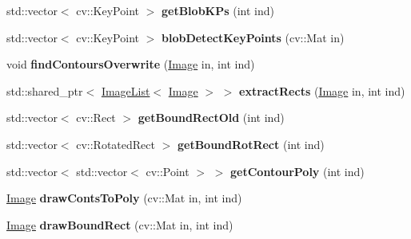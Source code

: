 \begin{DoxyCompactItemize}
\item 
std\+::vector$<$ cv\+::\+Key\+Point $>$ {\bfseries get\+Blob\+K\+Ps} (int ind)\hypertarget{classSegmenter_a36f865cdde985f42fbda4d49adee6eec}{}\label{classSegmenter_a36f865cdde985f42fbda4d49adee6eec}

\item 
std\+::vector$<$ cv\+::\+Key\+Point $>$ {\bfseries blob\+Detect\+Key\+Points} (cv\+::\+Mat in)\hypertarget{classSegmenter_a04e707d0e2d027d411ed1d49f1675a39}{}\label{classSegmenter_a04e707d0e2d027d411ed1d49f1675a39}

\item 
void {\bfseries find\+Contours\+Overwrite} (\hyperlink{classImage}{Image} in, int ind)\hypertarget{classSegmenter_a83f1dadfa90c7a55065bf7508f836a50}{}\label{classSegmenter_a83f1dadfa90c7a55065bf7508f836a50}

\item 
std\+::shared\+\_\+ptr$<$ \hyperlink{classImageList}{Image\+List}$<$ \hyperlink{classImage}{Image} $>$ $>$ {\bfseries extract\+Rects} (\hyperlink{classImage}{Image} in, int ind)\hypertarget{classSegmenter_ad1306f3d25657db48c54586169c607cd}{}\label{classSegmenter_ad1306f3d25657db48c54586169c607cd}

\item 
std\+::vector$<$ cv\+::\+Rect $>$ {\bfseries get\+Bound\+Rect\+Old} (int ind)\hypertarget{classSegmenter_a0ed74b8610d04960e96545a2769c791e}{}\label{classSegmenter_a0ed74b8610d04960e96545a2769c791e}

\item 
std\+::vector$<$ cv\+::\+Rotated\+Rect $>$ {\bfseries get\+Bound\+Rot\+Rect} (int ind)\hypertarget{classSegmenter_ad962f1ec52b2a08611cc6df03773ab61}{}\label{classSegmenter_ad962f1ec52b2a08611cc6df03773ab61}

\item 
std\+::vector$<$ std\+::vector$<$ cv\+::\+Point $>$ $>$ {\bfseries get\+Contour\+Poly} (int ind)\hypertarget{classSegmenter_a6b072eb0387886c01f5cf19cba30d738}{}\label{classSegmenter_a6b072eb0387886c01f5cf19cba30d738}

\item 
\hyperlink{classImage}{Image} {\bfseries draw\+Conts\+To\+Poly} (cv\+::\+Mat in, int ind)\hypertarget{classSegmenter_ab84556c3c16c492f78fb11ad4553a68a}{}\label{classSegmenter_ab84556c3c16c492f78fb11ad4553a68a}

\item 
\hyperlink{classImage}{Image} {\bfseries draw\+Bound\+Rect} (cv\+::\+Mat in, int ind)\hypertarget{classSegmenter_a0bc8e220e8b8bd6d0340cb6db7124b41}{}\label{classSegmenter_a0bc8e220e8b8bd6d0340cb6db7124b41}


\end{DoxyCompactItemize}
